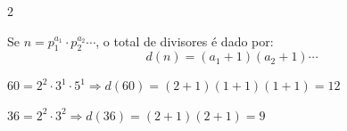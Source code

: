 \documentclass[12pt]{article}
\begin{document}
\begin{multicols}{2}

Se $n = p_1^{a_1} \cdot p_2^{a_2} \cdots$, o total de divisores é dado por:
$$d(n) = (a_1 + 1)(a_2 + 1) \cdots$$


$60 = 2^2 \cdot 3^1 \cdot 5^1 \Rightarrow d(60) = (2{+}1)(1{+}1)(1{+}1) = 12$

$36 = 2^2 \cdot 3^2 \Rightarrow d(36) = (2{+}1)(2{+}1) = 9$

\end{multicols}


\end{document}
